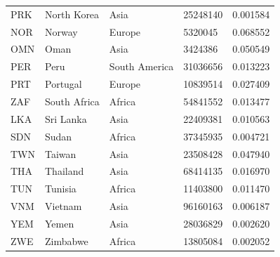 \documentclass[11pt]{report}
\begin{document}
\begin{table}[h!]
\begin{tabular}{lllll}
            PRK                           & North Korea               & Asia                           & 25248140                      & 0.001584                           \\
            NOR                           & Norway                    & Europe                         & 5320045                       & 0.068552                           \\
            OMN                           & Oman                      & Asia                           & 3424386                       & 0.050549                           \\
            PER                           & Peru                      & South America                  & 31036656                      & 0.013223                           \\
            PRT                           & Portugal                  & Europe                         & 10839514                      & 0.027409                           \\
            ZAF                           & South Africa              & Africa                         & 54841552                      & 0.013477                           \\
            LKA                           & Sri Lanka                 & Asia                           & 22409381                      & 0.010563                           \\
            SDN                           & Sudan                     & Africa                         & 37345935                      & 0.004721                           \\
            TWN                           & Taiwan                    & Asia                           & 23508428                      & 0.047940                           \\
            THA                           & Thailand                  & Asia                           & 68414135                      & 0.016970                           \\
            TUN                           & Tunisia                   & Africa                         & 11403800                      & 0.011470                           \\
            VNM                           & Vietnam                   & Asia                           & 96160163                      & 0.006187                           \\
            YEM                           & Yemen                     & Asia                           & 28036829                      & 0.002620                           \\
            ZWE                           & Zimbabwe                  & Africa                         & 13805084                      & 0.002052
        \end{tabular}
    \end{table}
\end{document}
